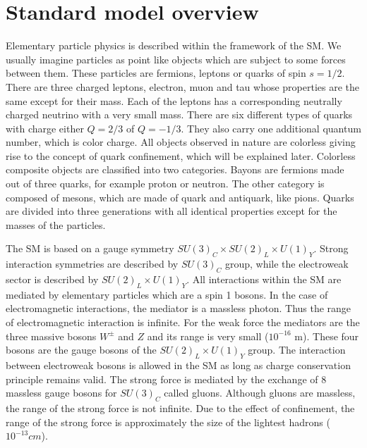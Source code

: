 
\section{Standard model overview}

\par Elementary particle physics is described within the framework of the SM. We usually imagine particles as point like objects which are subject to some forces between them. These particles are fermions, leptons or quarks of spin $s=1/2$. There are three charged leptons, electron, muon and tau whose properties are the same except for their mass. Each of the leptons has a corresponding neutrally charged neutrino with a very small mass. There are six different types of quarks with charge either $Q=2/3$ of $Q=-1/3$. They also carry one additional quantum number, which is color charge. All objects observed in nature are colorless giving rise to the concept of quark confinement, which will be explained later. Colorless composite objects are classified into two categories. Bayons are fermions made out of three  quarks, for example proton or neutron. The other category is composed of mesons, which are made of quark and antiquark, like pions. Quarks are divided into three generations with all identical properties except for the masses of the particles. 
\par The SM is based on a gauge symmetry $SU(3)_C \times SU(2)_L \times U(1)_Y$. Strong interaction symmetries are described by $SU(3)_C$ group, while the electroweak sector is described by $SU(2)_L \times U(1)_Y$. All interactions within the SM are mediated by elementary particles which are a spin 1 bosons. In the case of electromagnetic interactions, the mediator is a massless photon. Thus the range of electromagnetic interaction is infinite. For the weak force the mediators are the three massive bosons $W^{\pm}$ and $Z$ and its range is very small ($10^{-16}$ m). These four bosons are the gauge bosons of the $SU(2)_L \times U(1)_Y$ group. The interaction between electroweak bosons is allowed in the SM as long as charge conservation principle remains valid. The strong force is mediated by the exchange of 8 massless gauge bosons for $SU(3)_C$ called gluons. Although gluons are massless, the range of the strong force is not infinite. Due to the effect of confinement, the range of the strong force is approximately the size of the lightest hadrons ($10^{-13} cm$). 
